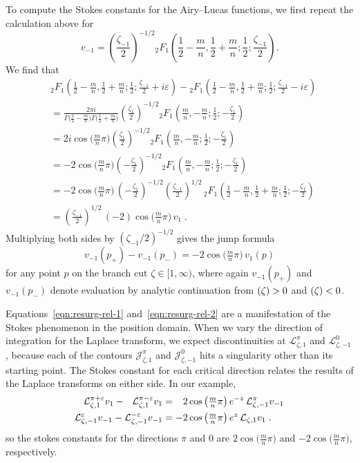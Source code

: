 \documentclass{article}
\let\Im\relax
\DeclareMathOperator{\Im}{Im}
\newcommand{\laplace}{\mathcal{L}}
\theoremstyle{definition}
\theoremstyle{plain}
\begin{document}
To compute the Stokes constants for the Airy--Lucas functions, we first repeat the calculation above for
\[ v_{-1} = \left(\frac{\zeta_{-1}}{2}\right)^{-1/2} {}_2F_1\left(\frac{1}{2}-\frac{m}{n},\frac{1}{2}+\frac{m}{n};\frac{1}{2};\frac{\zeta_{-1}}{2}\right). \]
We find that
\begin{align*}
&{}_2F_1\left(\frac{1}{2}-\frac{m}{n},\frac{1}{2}+\frac{m}{n};\frac{1}{2};\frac{\zeta_{-1}}{2}+i\varepsilon\right)-{}_2F_1\left(\frac{1}{2}-\frac{m}{n},\frac{1}{2}+\frac{m}{n};\frac{1}{2};\frac{\zeta_{-1}}{2}-i\varepsilon\right) \\
&=\frac{2\pi i}{\Gamma\big(\tfrac{1}{2}-\tfrac{m}{n}\big)\Gamma\big(\tfrac{1}{2}+\tfrac{m}{n}\big)} \left(\frac{\zeta_1}{2}\right)^{-1/2} {}_2F_1\left(\frac{m}{n},-\frac{m}{n};\frac{1}{2};-\frac{\zeta_1}{2}\right) \\
&=2i\cos\big(\tfrac{m}{n}\pi\big) \left(\frac{\zeta_1}{2}\right)^{-1/2} {}_2F_1\left(\frac{m}{n},-\frac{m}{n};\frac{1}{2};-\frac{\zeta_1}{2}\right) \\
&=-2\cos\big(\tfrac{m}{n}\pi\big) \left(-\frac{\zeta_1}{2}\right)^{-1/2} {}_2F_1\left(\frac{m}{n},-\frac{m}{n};\frac{1}{2};-\frac{\zeta_1}{2}\right) \\
&=-2\cos\big(\tfrac{m}{n}\pi\big)\,\left(-\frac{\zeta_{1}}{2}\right)^{-1/2} \left(\frac{\zeta_{-1}}{2}\right)^{1/2}\, {}_2F_1\left(\frac{1}{2}-\frac{m}{n},\frac{1}{2}+\frac{m}{n};\frac{1}{2};-\frac{\zeta_1}{2}\right) \\
&=\left(\frac{\zeta_{-1}}{2}\right)^{1/2}\,(-2)\cos\big(\tfrac{m}{n}\pi\big)\,v_1\;.
\end{align*}
Multiplying both sides by $(\zeta_{-1}/2)^{-1/2}$ gives the jump formula
\begin{equation}\label{eqn:resurg-rel-2}
v_{-1}(p_+) - v_{-1}(p_-) = -2\cos\big(\tfrac{m}{n}\pi\big)\,v_1(p)
\end{equation}
for any point $p$ on the branch cut $\zeta \in [1, \infty)$, where again $v_{-1}(p_+)$ and $v_{-1}(p_-)$ denote evaluation by analytic continuation from $\Im(\zeta) > 0$ and $\Im(\zeta) < 0$.

Equations~\eqref{eqn:resurg-rel-1} and~\eqref{eqn:resurg-rel-2} are a manifestation of the Stokes phenomenon in the position domain. When we vary the direction of integration for the Laplace transform, we expect discontinuities at $\laplace^\pi_{\zeta,1}$ and $\laplace^0_{\zeta,-1}$, because each of the contours $\mathcal{J}^\pi_{\zeta,1}$ and $\mathcal{J}^0_{\zeta,-1}$ hits a singularity other than its starting point. The Stokes constant for each critical direction relates the results of the Laplace transforms on either side. In our example,
\begin{align*}
\laplace_{\zeta,1}^{\pi+\varepsilon} v_1 - \hphantom{{}_{-}}\laplace_{\zeta,1}^{\pi-\varepsilon} v_1 & = \hphantom{-}2\cos\big(\tfrac{m}{n}\pi\big) \, e^{-z}\, \laplace_{\zeta,-1}^{\pi} v_{-1} \\
\laplace_{\zeta,-1}^{\varepsilon} v_{-1} - \laplace_{\zeta,-1}^{-\varepsilon} v_{-1} & = -2\cos\big(\tfrac{m}{n}\pi\big) \, e^z \, \laplace_{\zeta,1} v_{1}\;.
\end{align*}
so the stokes constants for the directions $\pi$ and $0$ are $2\cos\big(\tfrac{m}{n}\pi\big)$ and $-2\cos\big(\tfrac{m}{n}\pi\big)$, respectively.
\end{document}
